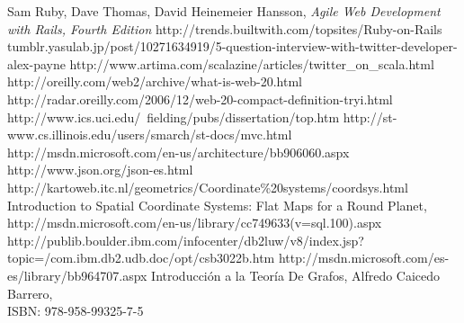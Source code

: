 \begin{thebibliography}{99}
   Sam Ruby, Dave Thomas, David Heinemeier Hansson, \emph{Agile Web Development with Rails, Fourth Edition}
    http://trends.builtwith.com/topsites/Ruby-on-Rails
   tumblr.yasulab.jp/post/10271634919/5-question-interview-with-twitter-developer-alex-payne
   http://www.artima.com/scalazine/articles/twitter\_on\_scala.html
   http://oreilly.com/web2/archive/what-is-web-20.html
   http://radar.oreilly.com/2006/12/web-20-compact-definition-tryi.html
   http://www.ics.uci.edu/~fielding/pubs/dissertation/top.htm
   http://st-www.cs.illinois.edu/users/smarch/st-docs/mvc.html
   http://msdn.microsoft.com/en-us/architecture/bb906060.aspx
   http://www.json.org/json-es.html
   http://kartoweb.itc.nl/geometrics/Coordinate\%20systems/coordsys.html
   Introduction to Spatial Coordinate Systems: Flat Maps for a Round Planet,\\ http://msdn.microsoft.com/en-us/library/cc749633(v=sql.100).aspx
   http://publib.boulder.ibm.com/infocenter/db2luw/v8/index.jsp?\\topic=/com.ibm.db2.udb.doc/opt/csb3022b.htm
   http://msdn.microsoft.com/es-es/library/bb964707.aspx
   Introducción a la Teoría De Grafos, Alfredo Caicedo Barrero, \\ISBN: 978-958-99325-7-5



\end{thebibliography}
